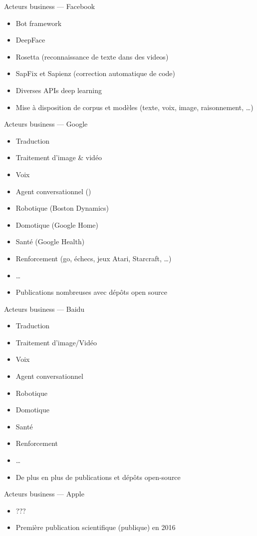 \begin{frame}{Acteurs business --- Facebook}
  \begin{itemize}
  \item Bot framework
  \item DeepFace
  \item Rosetta (reconnaissance de texte dans des videos)
  \item SapFix et Sapienz (correction automatique de code)
  \item Diverses APIs deep learning
  \item Mise à disposition de corpus et modèles (texte, voix, image, raisonnement, …)
  \end{itemize}
\end{frame}

\begin{frame}{Acteurs business --- Google}
  \begin{itemize}
  \item Traduction
  \item Traitement d'image \& vidéo
  \item Voix
  \item Agent conversationnel ()
  \item Robotique (Boston Dynamics)
  \item Domotique (Google Home)
  \item Santé (Google Health)
  \item Renforcement (go, échecs, jeux Atari, Starcraft, …)
  \item …
  \item Publications nombreuses avec dépôts open source
  \end{itemize}
\end{frame}

\begin{frame}{Acteurs business --- Baidu}
  \begin{itemize}
  \item Traduction
  \item Traitement d'image/Vidéo
  \item Voix
  \item Agent conversationnel
  \item Robotique
  \item Domotique
  \item Santé
  \item Renforcement
  \item …
  \item De plus en plus de publications et dépôts open-source
  \end{itemize}
\end{frame}

\begin{frame}{Acteurs business --- Apple}
  \begin{itemize}
  \item ???
  \item Première publication scientifique (publique) en 2016
  \end{itemize}
\end{frame}
